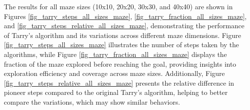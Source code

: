 The results for all maze sizes (10x10, 20x20, 30x30, and 40x40) are shown in Figures \ref{fig_tarry_steps_all_sizes_maze}, \ref{fig_tarry_fraction_all_sizes_maze}, and \ref{fig_tarry_steps_relative_all_sizes_maze}, demonstrating the performance of Tarry's algorithm and its variations across different maze dimensions. Figure \ref{fig_tarry_steps_all_sizes_maze} illustrates the number of steps taken by the algorithms, while Figure \ref{fig_tarry_fraction_all_sizes_maze} displays the fraction of the maze explored before reaching the goal, providing insights into exploration efficiency and coverage across maze sizes. Additionally, Figure \ref{fig_tarry_steps_relative_all_sizes_maze} presents the relative difference in pioneer steps compared to the original Tarry's algorithm, helping to better compare the variations, which may show similar behaviors.

